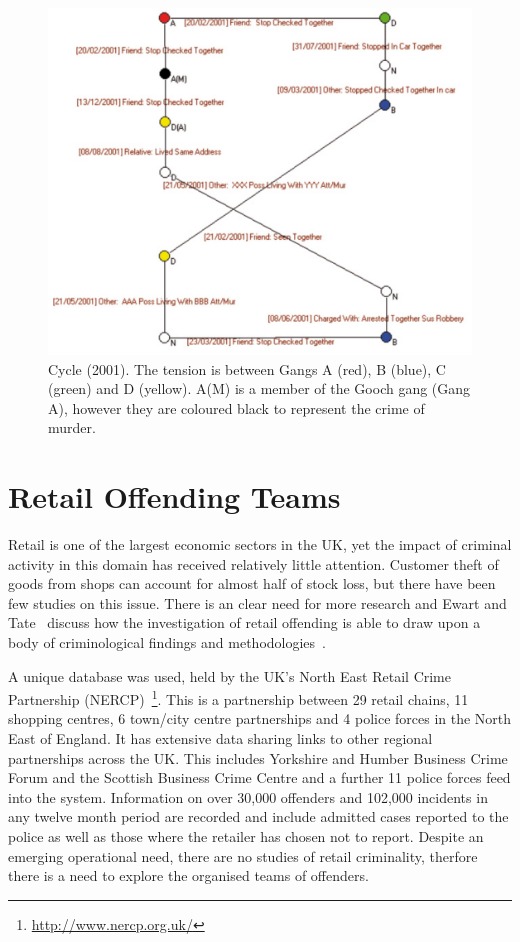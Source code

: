 \documentclass[conference]{IEEEtran}
\theoremstyle{definition}
\begin{document}
\begin{figure}[!ht] 
\centering
\includegraphics[width=\columnwidth]{images/chain2001}
\caption{Cycle (2001). The tension is between Gangs A (red), B (blue),
 C (green) and D (yellow). A(M) is a member of the Gooch gang (Gang A), however they are coloured black to represent the crime of murder.}
\label{fig:chain2001}
\end{figure}


\section{Retail Offending Teams}\label{sec:retail}
Retail is one of the largest economic sectors in the UK, yet the
impact of criminal activity in this domain has received relatively
little attention.  Customer theft of goods from shops can account for
almost half of stock loss, but there have been few studies on this
issue. There is an clear need for more research and Ewart and
Tate~\cite{EwartTate2007} discuss how the investigation of retail
offending is able to draw upon a body of criminological findings and
methodologies~\cite{Bamfield2006}.

A unique database was used, held by the UK's North East Retail Crime
Partnership (NERCP)~\footnote{\url{http://www.nercp.org.uk/}}.  This
is a partnership between 29 retail chains, 11 shopping centres, 6
town/city centre partnerships and 4 police forces in the North East of
England.  It has extensive data sharing links to other regional
partnerships across the UK.  This includes Yorkshire and Humber
Business Crime Forum and the Scottish Business Crime Centre and a
further 11 police forces feed into the system. Information on over
30,000 offenders and 102,000 incidents in any twelve month period are
recorded and include admitted cases reported to the police as well as
those where the retailer has chosen not to report. Despite an emerging
operational need, there are no studies of retail criminality, therfore
there is a need to explore the organised teams of offenders.
\end{document}
